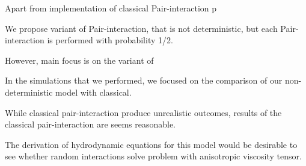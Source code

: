 Apart from implementation of classical Pair-interaction p




We propose variant of Pair-interaction, that is not deterministic, but each Pair-interaction is performed with probability 1/2.


However, main focus is on the variant of

In the simulations that we performed, we focused on the comparison of our non-deterministic model with classical.

While classical pair-interaction produce unrealistic outcomes, results of the classical pair-interaction are seems reasonable.

The derivation of hydrodynamic equations for this model would be desirable to see whether random interactions solve problem with anisotropic viscosity tensor.